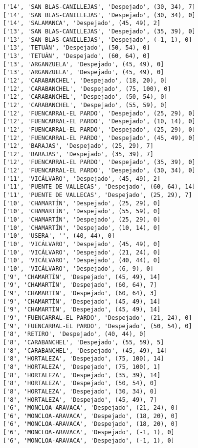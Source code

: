 \documentclass[11pt]{article}
\begin{document}
\begin{Verbatim}[commandchars=\\\{\}]
['14', 'SAN BLAS-CANILLEJAS', 'Despejado', (30, 34), 7]
['14', 'SAN BLAS-CANILLEJAS', 'Despejado', (30, 34), 0]
['14', 'SALAMANCA', 'Despejado', (45, 49), 2]
['13', 'SAN BLAS-CANILLEJAS', 'Despejado', (35, 39), 0]
['13', 'SAN BLAS-CANILLEJAS', 'Despejado', (-1, 1), 0]
['13', 'TETUÁN', 'Despejado', (50, 54), 0]
['13', 'TETUÁN', 'Despejado', (60, 64), 0]
['13', 'ARGANZUELA', 'Despejado', (45, 49), 0]
['13', 'ARGANZUELA', 'Despejado', (45, 49), 0]
['12', 'CARABANCHEL', 'Despejado', (18, 20), 0]
['12', 'CARABANCHEL', 'Despejado', (75, 100), 0]
['12', 'CARABANCHEL', 'Despejado', (50, 54), 0]
['12', 'CARABANCHEL', 'Despejado', (55, 59), 0]
['12', 'FUENCARRAL-EL PARDO', 'Despejado', (25, 29), 0]
['12', 'FUENCARRAL-EL PARDO', 'Despejado', (10, 14), 0]
['12', 'FUENCARRAL-EL PARDO', 'Despejado', (25, 29), 0]
['12', 'FUENCARRAL-EL PARDO', 'Despejado', (45, 49), 0]
['12', 'BARAJAS', 'Despejado', (25, 29), 7]
['12', 'BARAJAS', 'Despejado', (35, 39), 7]
['12', 'FUENCARRAL-EL PARDO', 'Despejado', (35, 39), 0]
['12', 'FUENCARRAL-EL PARDO', 'Despejado', (30, 34), 0]
['11', 'VICÁLVARO', 'Despejado', (45, 49), 2]
['11', 'PUENTE DE VALLECAS', 'Despejado', (60, 64), 14]
['11', 'PUENTE DE VALLECAS', 'Despejado', (25, 29), 7]
['10', 'CHAMARTÍN', 'Despejado', (25, 29), 0]
['10', 'CHAMARTÍN', 'Despejado', (55, 59), 0]
['10', 'CHAMARTÍN', 'Despejado', (25, 29), 0]
['10', 'CHAMARTÍN', 'Despejado', (10, 14), 0]
['10', 'USERA', '', (40, 44), 0]
['10', 'VICÁLVARO', 'Despejado', (45, 49), 0]
['10', 'VICÁLVARO', 'Despejado', (21, 24), 0]
['10', 'VICÁLVARO', 'Despejado', (40, 44), 0]
['10', 'VICÁLVARO', 'Despejado', (6, 9), 0]
['9', 'CHAMARTÍN', 'Despejado', (45, 49), 14]
['9', 'CHAMARTÍN', 'Despejado', (60, 64), 7]
['9', 'CHAMARTÍN', 'Despejado', (60, 64), 3]
['9', 'CHAMARTÍN', 'Despejado', (45, 49), 14]
['9', 'CHAMARTÍN', 'Despejado', (45, 49), 14]
['9', 'FUENCARRAL-EL PARDO', 'Despejado', (21, 24), 0]
['9', 'FUENCARRAL-EL PARDO', 'Despejado', (50, 54), 0]
['8', 'RETIRO', 'Despejado', (40, 44), 0]
['8', 'CARABANCHEL', 'Despejado', (55, 59), 5]
['8', 'CARABANCHEL', 'Despejado', (45, 49), 14]
['8', 'HORTALEZA', 'Despejado', (75, 100), 14]
['8', 'HORTALEZA', 'Despejado', (75, 100), 1]
['8', 'HORTALEZA', 'Despejado', (35, 39), 14]
['8', 'HORTALEZA', 'Despejado', (50, 54), 0]
['8', 'HORTALEZA', 'Despejado', (30, 34), 0]
['8', 'HORTALEZA', 'Despejado', (45, 49), 7]
['6', 'MONCLOA-ARAVACA', 'Despejado', (21, 24), 0]
['6', 'MONCLOA-ARAVACA', 'Despejado', (18, 20), 0]
['6', 'MONCLOA-ARAVACA', 'Despejado', (18, 20), 0]
['6', 'MONCLOA-ARAVACA', 'Despejado', (-1, 1), 0]
['6', 'MONCLOA-ARAVACA', 'Despejado', (-1, 1), 0]

\end{Verbatim}
\end{document}
